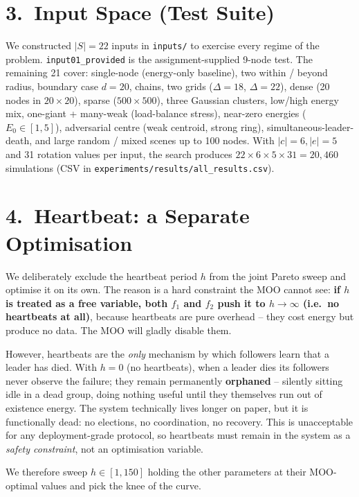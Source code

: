 \documentclass[a4paper,10pt]{article}
\begin{document}
\section*{3.\ Input Space (Test Suite)}
\vspace{-0.4em}
We constructed $|S|=22$ inputs in \texttt{inputs/} to exercise every regime of the problem.
\texttt{input01\_provided} is the assignment-supplied 9-node test.
The remaining 21 cover: single-node (energy-only baseline), two within / beyond radius, boundary case $d=20$,
chains, two grids ($\Delta{=}18$, $\Delta{=}22$), dense (20 nodes in $20{\times}20$), sparse ($500{\times}500$),
three Gaussian clusters, low/high energy mix, one-giant + many-weak (load-balance stress),
near-zero energies ($E_0\!\in\![1,5]$), adversarial centre (weak centroid, strong ring), simultaneous-leader-death,
and large random / mixed scenes up to 100 nodes. With $|c|{=}6,|e|{=}5$ and 31 rotation values per
input, the search produces $22\!\times\!6\!\times\!5\!\times\!31 = 20{,}460$ simulations (CSV in
\texttt{experiments/results/all\_results.csv}).

\vspace{-0.4em}
\section*{4.\ Heartbeat: a Separate Optimisation}
\vspace{-0.4em}
We deliberately exclude the heartbeat period $h$ from the joint Pareto sweep and optimise it on its own.
The reason is a hard constraint the MOO cannot see: \textbf{if $h$ is treated as a free variable, both
$f_1$ and $f_2$ push it to $h\!\to\!\infty$ (i.e.\ no heartbeats at all)}, because heartbeats are pure overhead
-- they cost energy but produce no data. The MOO will gladly disable them.

However, heartbeats are the \emph{only} mechanism by which followers learn that a leader has died.
With $h{=}0$ (no heartbeats), when a leader dies its followers never observe the failure; they remain
permanently \textbf{orphaned} -- silently sitting idle in a dead group, doing nothing useful until they
themselves run out of existence energy. The system technically lives longer on paper, but it is functionally
dead: no elections, no coordination, no recovery. This is unacceptable for any deployment-grade protocol,
so heartbeats must remain in the system as a \emph{safety constraint}, not an optimisation variable.

We therefore sweep $h\!\in\![1,150]$ holding the other parameters at their MOO-optimal values and pick
the knee of the curve.
\end{document}
